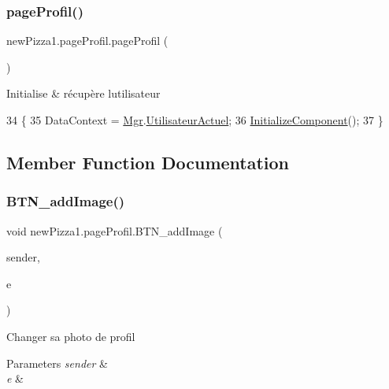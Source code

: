 \subsubsection{\texorpdfstring{page\+Profil()}{pageProfil()}}
{\footnotesize\ttfamily new\+Pizza1.\+page\+Profil.\+page\+Profil (\begin{DoxyParamCaption}{ }\end{DoxyParamCaption})\hspace{0.3cm}{\ttfamily [inline]}}



Initialise \& récupère l\textquotesingle{}utilisateur 


\begin{DoxyCode}
34         \{
35             DataContext = \hyperlink{classnewPizza1_1_1pageProfil_af21fd7e24c11b3a1c5ed9f0ca1af2368}{Mgr}.\hyperlink{classModele_1_1Manager_aa00c4632bd15b247d6b6793a6797dc82}{UtilisateurActuel};
36             \hyperlink{classnewPizza1_1_1pageProfil_a53ca6e755a62dfda0434ae88b7355d3e}{InitializeComponent}();
37         \}
\end{DoxyCode}


\subsection{Member Function Documentation}
\mbox{\label{classnewPizza1_1_1pageProfil_a2a3ca4fec9cf0f5a3b5a802a82e38757}} 
\subsubsection{\texorpdfstring{B\+T\+N\+\_\+add\+Image()}{BTN\_addImage()}}
{\footnotesize\ttfamily void new\+Pizza1.\+page\+Profil.\+B\+T\+N\+\_\+add\+Image (\begin{DoxyParamCaption}\item[{object}]{sender,  }\item[{Routed\+Event\+Args}]{e }\end{DoxyParamCaption})\hspace{0.3cm}{\ttfamily [inline]}}



Changer sa photo de profil 


\begin{DoxyParams}{Parameters}
{\em sender} & \\
\hline
{\em e} & \\
\hline
\end{DoxyParams}

